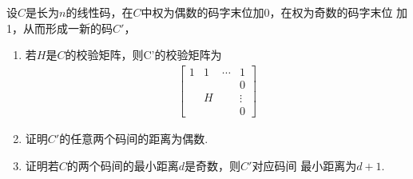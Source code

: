 设$C$是长为$n$的线性码，在$C$中权为偶数的码字末位加0，在权为奇数的码字末位
加1，从而形成一新的码$C'$，
\begin{enumerate}
    \item 若${H}$是$C$的校验矩阵，则C'的校验矩阵为
    \begin{align*}
        \left[\begin{matrix}
            1&1&\cdots&1\\
             & & &0\\
             &H& &\vdots\\
             & & &0
        \end{matrix}\right]
    \end{align*}
    \item 证明$C'$的任意两个码间的距离为偶数.
    \item 证明若$C$的两个码间的最小距离$d$是奇数，则$C'$对应码间
    最小距离为$d+1$.
\end{enumerate}